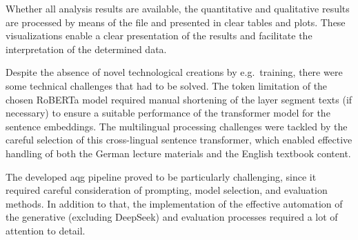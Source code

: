 Whether all analysis results are available, the quantitative and qualitative results are processed by means of the  file and presented in clear tables and plots. These visualizations enable a clear presentation of the results and facilitate the interpretation of the determined data.

Despite the absence of novel technological creations by e.g.\ training, there were some technical challenges that had to be solved. The token limitation of the chosen RoBERTa model required manual shortening of the layer segment texts (if necessary) to ensure a suitable performance of the transformer model for the sentence embeddings. The multilingual processing challenges were tackled by the careful selection of this cross-lingual sentence transformer, which enabled effective handling of both the German lecture materials and the English textbook content.

The developed \ac{aqg} pipeline proved to be particularly challenging, since it required careful consideration of prompting, model selection, and evaluation methods. In addition to that, the implementation of the effective automation of the generative (excluding DeepSeek) and evaluation processes required a lot of attention to detail. 
